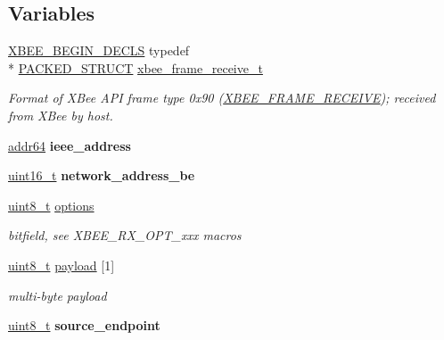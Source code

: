 \subsection*{Variables}
\begin{DoxyCompactItemize}
\item 
\hyperlink{group__hal_ga336bff4f4a6012aacc4468132bbd3d7f}{X\-B\-E\-E\-\_\-\-B\-E\-G\-I\-N\-\_\-\-D\-E\-C\-L\-S} typedef \\*
\hyperlink{group___s_x_a_ga4233297bd31be5c273d4fb0758cc54d7}{P\-A\-C\-K\-E\-D\-\_\-\-S\-T\-R\-U\-C\-T} \hyperlink{group__xbee__wpan_ga0d1e37574952bdf60cda7f1351b41a9e}{xbee\-\_\-frame\-\_\-receive\-\_\-t}
\begin{DoxyCompactList}\small\item\em Format of X\-Bee A\-P\-I frame type 0x90 (\hyperlink{group__xbee__device_gga7753bbebaf00d6d64942f64b6ae9b7b9ab6fa3650abecfac4645c5d4ccdf857fd}{X\-B\-E\-E\-\_\-\-F\-R\-A\-M\-E\-\_\-\-R\-E\-C\-E\-I\-V\-E}); received from X\-Bee by host. \end{DoxyCompactList}\item 
\hypertarget{group__xbee__wpan_ga2549f921e25a72dfa05a2154a792e2bf}{\hyperlink{unionaddr64}{addr64} {\bfseries ieee\-\_\-address}}\label{group__xbee__wpan_ga2549f921e25a72dfa05a2154a792e2bf}

\item 
\hypertarget{group__xbee__wpan_ga73d48563eb05cd5fcc4add79d226a3b8}{\hyperlink{group__hal_ga5a8b2dc9e45a9ee81a94ef304fb62505}{uint16\-\_\-t} {\bfseries network\-\_\-address\-\_\-be}}\label{group__xbee__wpan_ga73d48563eb05cd5fcc4add79d226a3b8}

\item 
\hyperlink{group__hal_gae1affc9ca37cfb624959c866a73f83c2}{uint8\-\_\-t} \hyperlink{group__xbee__wpan_gaace3d640c8d449b8db1162993d259d3f}{options}
\begin{DoxyCompactList}\small\item\em bitfield, see X\-B\-E\-E\-\_\-\-R\-X\-\_\-\-O\-P\-T\-\_\-xxx macros \end{DoxyCompactList}\item 
\hypertarget{group__xbee__wpan_gae6f5e79770e3e599bf8154eac1a2f3fe}{\hyperlink{group__hal_gae1affc9ca37cfb624959c866a73f83c2}{uint8\-\_\-t} \hyperlink{group__xbee__wpan_gae6f5e79770e3e599bf8154eac1a2f3fe}{payload} \mbox{[}1\mbox{]}}\label{group__xbee__wpan_gae6f5e79770e3e599bf8154eac1a2f3fe}

\begin{DoxyCompactList}\small\item\em multi-\/byte payload \end{DoxyCompactList}\item 
\hypertarget{group__xbee__wpan_ga9781a5a281ee97f7f67d8ebe2c4f54db}{\hyperlink{group__hal_gae1affc9ca37cfb624959c866a73f83c2}{uint8\-\_\-t} {\bfseries source\-\_\-endpoint}}\label{group__xbee__wpan_ga9781a5a281ee97f7f67d8ebe2c4f54db}


\end{DoxyCompactItemize}
